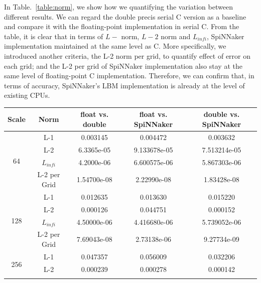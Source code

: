 In Table.~\ref{table:norm}, we show how we quantifying the variation between different results. We can regard the double precis serial C version as a baseline and compare it with the floating-point implementation in serial C. From the table, it is clear that in terms of $L-$ norm, $L-2$ norm and $L_{infi}$, SpiNNaker implementation maintained at the same level as C. More specifically, we introduced another criteria, the L-2 norm per grid, to quantify effect of error on each grid; and the L-2 per grid of SpiNNaker implementation also stay at the same level of floating-point C implementation. Therefore, we can confirm that, in terms of accuracy, SpiNNaker's LBM implementation is already at the level of existing CPUs.\\

\begin{table}[tb]
\begin{tabular}{|c|c|c|c|c|}
\hline
Scale                & Norm        & float vs. double& float vs. SpiNNaker& double vs. SpiNNaker\\ \hline
\multirow{4}{*}{64}  & L-1          & 0.003145             & 0.004472              & 0.003632               \\ \cline{2-5} 
                     & L-2          & 6.3365e-05           & 9.133678e-05          & 7.513214e-05           \\ \cline{2-5} 
                     & $L_{infi}$  & 4.2000e-06           & 6.600575e-06          & 5.867303e-06           \\ \cline{2-5} 
                     & L-2 per Grid & 1.54700e-08          & 2.22990e-08           & 1.83428e-08            \\ \hline
\multirow{4}{*}{128} & L-1          & 0.012635             & 0.013630              & 0.015220               \\ \cline{2-5} 
                     & L-2          & 0.000126             & 0.044751              & 0.000152               \\ \cline{2-5} 
                     & $L_{infi}$  & 4.50000e-06          & 4.416680e-06          & 5.739052e-06           \\ \cline{2-5} 
                     & L-2 per Grid & 7.69043e-08          & 2.73138e-06           & 9.27734e-09            \\ \hline
\multirow{4}{*}{256} & L-1          & 0.047357             & 0.056009              & 0.032206               \\ \cline{2-5} 
                     & L-2          & 0.000239             & 0.000278              & 0.000142               \\ \cline{2-5} 

\end{tabular}
\end{table}
